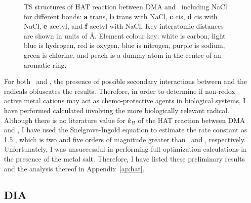 \begin{figure}[!htbp]\ContinuedFloat
  \setcounter{subfigure}{4}

  \caption[TS structures of HAT reaction between DMA and \bno\ including
  NaCl.]{TS structures of HAT reaction between DMA and \bno\ including NaCl for
  different  bonds: \textbf{a} trans, \textbf{b} trans with NaCl,
  \textbf{c} cis, \textbf{d} cis with NaCl, \textbf{e} acetyl, and \textbf{f}
  acetyl with NaCl. Key interatomic distances are shown in units of \AA.
  Element colour key: white is carbon, light blue is hydrogen, red is oxygen,
  blue is nitrogen, purple is sodium, green is chlorine, and peach is a dummy
  atom in the centre of an aromatic ring.} \label{fig:dma-bno-ts}
\end{figure}

For both \cumo\ and \bno, the presence of possible secondary interactions
between  and the radicals obfuscates the results. Therefore, in order
to determine if non-redox active metal cations may act as chemo-protective
agents in biological systems, I have performed calculated involving the more
biologically relevant  radical. Although there is no literature value
for $k_H$ of the HAT reaction between DMA and , I have used the
Snelgrove-Ingold equation\cite{Snelgrove2001} to estimate the rate constant as
1.5 \Ms, which is two and five orders of magnitude greater than \bno\ and
\cumo, respectively. Unfortunately, I was unsuccessful in performing full
optimization calculations in the presence of the metal salt. Therefore, I have
listed these preliminary results and the analysis thereof in
Appendix~\ref{ap:hat}.


\subsection{DIA}

